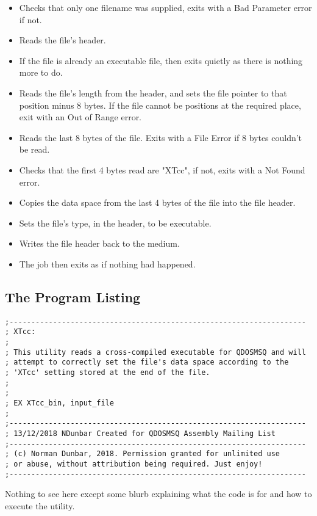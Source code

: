 \begin{itemize}
	\item Checks that only one filename was supplied, exits with a Bad Parameter error if not.
	\item Reads the file's header.
	\item If the file is already an executable file, then exits quietly as there is nothing more to do.
	\item Reads the file's length from the header, and sets the file pointer to that position minus 8 bytes. If the file cannot be positions at the required place, exit with an Out of Range error.
	\item Reads the last 8 bytes of the file. Exits with a File Error if 8 bytes couldn't be read.
	\item Checks that the first 4 bytes read are "XTcc", if not, exits with a Not Found error.
	\item Copies the data space from the last 4 bytes of the file into the file header.
	\item Sets the file's type, in the header, to be executable.
	\item Writes the file header back to the medium.
	\item The job then exits as if nothing had happened.
\end{itemize}


\subsection{The Program Listing}


\begin{lstlisting}[firstnumber=1,caption={XTcc - Comments}]
;--------------------------------------------------------------------
; XTcc:
;
; This utility reads a cross-compiled executable for QDOSMSQ and will
; attempt to correctly set the file's data space according to the
; 'XTcc' setting stored at the end of the file.
;
;
; EX XTcc_bin, input_file
;
;--------------------------------------------------------------------
; 13/12/2018 NDunbar Created for QDOSMSQ Assembly Mailing List
;--------------------------------------------------------------------
; (c) Norman Dunbar, 2018. Permission granted for unlimited use
; or abuse, without attribution being required. Just enjoy!
;--------------------------------------------------------------------
\end{lstlisting}

Nothing to see here except some blurb explaining what the code is for and how to execute the utility.


